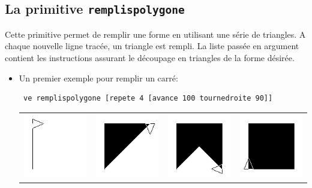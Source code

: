 \subsection{La primitive \texttt{remplispolygone}}
\noindent
{}
Cette primitive permet de remplir une forme en utilisant une série de triangles. A chaque nouvelle ligne tracée, un triangle est rempli. La liste passée en argument contient les instructions assurant le découpage en triangles de la forme désirée.\\
\begin{itemize}
 \item Un premier exemple pour remplir un carré:
\begin{verbatim}
 ve remplispolygone [repete 4 [avance 100 tournedroite 90]]
\end{verbatim}
\begin{center}
 \begin{tabular}{cccc}
 \includegraphics[width=3cm]{images/fillpolygonsquare1.png}& \includegraphics[width=3cm]{images/fillpolygonsquare2.png}& \includegraphics[width=3cm]{images/fillpolygonsquare3.png}& \includegraphics[width=3cm]{images/fillpolygonsquare4.png}\\ 

\end{tabular}
\end{center}
\end{itemize}

